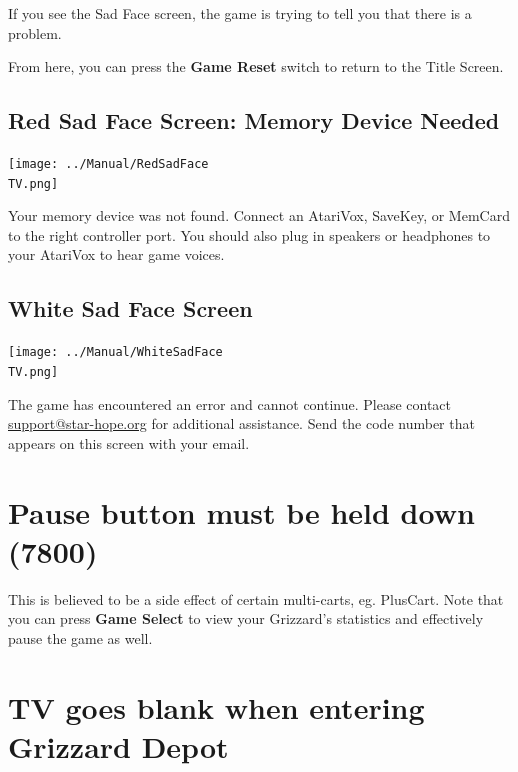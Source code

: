 \documentclass[10pt,twocolumn,openany,article]{memoir}
\newcommand\TV{NTSC}
\newcommand\TV{PAL}
\newcommand\TV{SECAM}
\begin{document}
If you  see the Sad  Face screen,  the game is  trying to tell  you that
there is a problem.

From here, you can press the \textbf{Game Reset} switch to return to the
Title Screen.

\ifdefined\ATARIAGESAVE\else\ifdefined\NOSAVE\else

\subsection{Red Sad Face Screen: Memory Device Needed}

\texttt{[image: ../Manual/RedSadFace\\TV.png]}

Your  memory device  was not  found.  Connect an  AtariVox, SaveKey,  or
MemCard to the  right controller port. You should also  plug in speakers
or headphones to your AtariVox to hear game voices.

\fi\fi

\subsection{White Sad Face Screen}

\texttt{[image: ../Manual/WhiteSadFace\\TV.png]}

The game  has encountered an  error and cannot continue.  Please contact
\href{mailto:support@star-hope.org}{support@star-hope.org}           for
additional assistance. Send the code  number that appears on this screen
with your email.

\ifdefined\ATARIAGESAVE\else

\section*{Pause button must be held down (7800)}

This  is believed  to  be  a side  effect  of  certain multi-carts,  eg.
PlusCart.  Note that  you can  press \textbf{Game  Select} to  view your
Grizzard's statistics and effectively pause the game as well.

\fi

\ifdefined\NOSAVE\else\ifdefined\ATARIAGESAVE\else

\section*{TV goes blank when entering Grizzard Depot}
\end{document}
